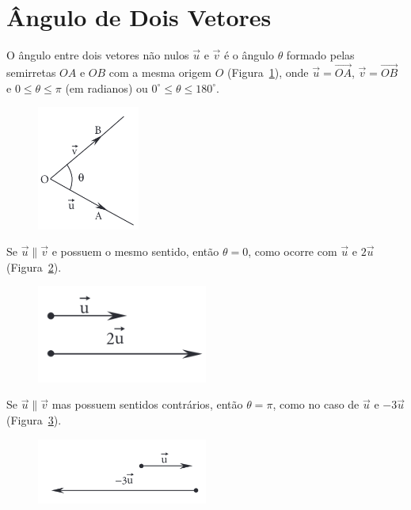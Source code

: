 \section{Ângulo de Dois Vetores}

O ângulo entre dois vetores não nulos \( \overrightarrow{u} \) e \(
\overrightarrow{v} \) é o ângulo \( \theta \) formado pelas semirretas \( OA \)
e \( OB \) com a mesma origem \( O \) (Figura~\ref{fig:fig1.21}), onde \(
\overrightarrow{u} = \overrightarrow{OA} \), \( \overrightarrow{v} =
\overrightarrow{OB} \) e \( 0 \leq \theta \leq \pi \) (em radianos) ou \(
0^\circ \leq \theta \leq 180^\circ \).

\begin{figure}[H]
    \centering
    \includegraphics[width=0.3\textwidth]{./fig/fig1.21.png}
    \caption{}\label{fig:fig1.21}
\end{figure}

Se \( \overrightarrow{u} \parallel \overrightarrow{v} \) e possuem o mesmo
sentido, então \( \theta = 0 \), como ocorre com \( \overrightarrow{u} \) e \(
2\overrightarrow{u} \) (Figura~\ref{fig:fig1.22a}).

\begin{figure}[H]
    \centering
    \includegraphics[width=0.5\textwidth]{./fig/fig1.22a.png}
    \caption{}\label{fig:fig1.22a}
\end{figure}

Se \( \overrightarrow{u} \parallel \overrightarrow{v} \) mas possuem sentidos
contrários, então \( \theta = \pi \), como no caso de \( \overrightarrow{u} \) e
\( -3\overrightarrow{u} \) (Figura~\ref{fig:fig1.22b}).

\begin{figure}[H]
    \centering
    \includegraphics[width=0.5\textwidth]{./fig/fig1.22b.png}
    \caption{}\label{fig:fig1.22b}
\end{figure}
